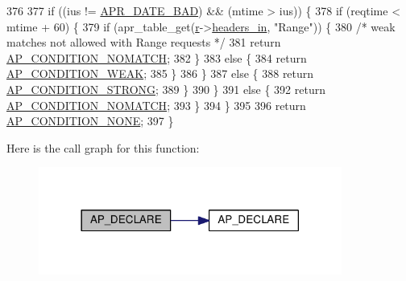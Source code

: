 \begin{DoxyCode}
376 
377         \textcolor{keywordflow}{if} ((ius != \hyperlink{group__APR__Util__Date_ga8be88b25f4b477ad13c4067c959411b0}{APR\_DATE\_BAD}) && (mtime > ius)) \{
378             \textcolor{keywordflow}{if} (reqtime < mtime + 60) \{
379                 \textcolor{keywordflow}{if} (apr\_table\_get(\hyperlink{group__APACHE__CORE__CONFIG_ga091cdd45984e865a888a4f8bb8fe107a}{r}->\hyperlink{structrequest__rec_a5497da6c01af49acf70a4a9b975c1c83}{headers\_in}, \textcolor{stringliteral}{"Range"})) \{
380                     \textcolor{comment}{/* weak matches not allowed with Range requests */}
381                     \textcolor{keywordflow}{return} \hyperlink{group__APACHE__CORE__PROTO_gga0c22f044612f116fb81886e73bbce80baa8fec426bc27e2c7c079f92975cc24f9}{AP\_CONDITION\_NOMATCH};
382                 \}
383                 \textcolor{keywordflow}{else} \{
384                     \textcolor{keywordflow}{return} \hyperlink{group__APACHE__CORE__PROTO_gga0c22f044612f116fb81886e73bbce80ba9d92b60c761cdd20d7c4a14a7b792a5e}{AP\_CONDITION\_WEAK};
385                 \}
386             \}
387             \textcolor{keywordflow}{else} \{
388                 \textcolor{keywordflow}{return} \hyperlink{group__APACHE__CORE__PROTO_gga0c22f044612f116fb81886e73bbce80ba6d0b908f370f8abf6844212b00450138}{AP\_CONDITION\_STRONG};
389             \}
390         \}
391         \textcolor{keywordflow}{else} \{
392             \textcolor{keywordflow}{return} \hyperlink{group__APACHE__CORE__PROTO_gga0c22f044612f116fb81886e73bbce80baa8fec426bc27e2c7c079f92975cc24f9}{AP\_CONDITION\_NOMATCH};
393         \}
394     \}
395 
396     \textcolor{keywordflow}{return} \hyperlink{group__APACHE__CORE__PROTO_gga0c22f044612f116fb81886e73bbce80ba17467018aa3f4f491951e6b278df0f7c}{AP\_CONDITION\_NONE};
397 \}
\end{DoxyCode}


Here is the call graph for this function\+:
\nopagebreak
\begin{figure}[H]
\begin{center}
\leavevmode
\includegraphics[width=282pt]{group__APACHE__CORE__PROTO_ga38a67300f881ecfcc3d842d2ce8e2162_cgraph}
\end{center}
\end{figure}


